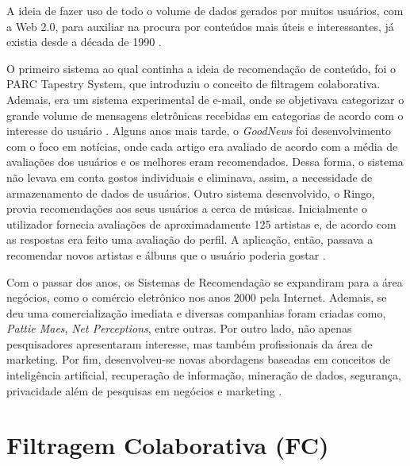A ideia de fazer uso de todo o volume de dados gerados por muitos usuários, com a Web 2.0, para auxiliar na procura por conteúdos mais úteis e interessantes, já existia desde a década de 1990 \cite{Jannach2010}.

O primeiro sistema ao qual continha a ideia de recomendação de conteúdo, foi o PARC Tapestry System, que introduziu o conceito de filtragem colaborativa. Ademais, era um sistema experimental de e-mail, onde se objetivava categorizar o grande volume de mensagens eletrônicas recebidas em categorias de acordo com o interesse do usuário \cite{Goldberg1992}.
Alguns anos mais tarde, o \textit{GoodNews} foi desenvolvimento com o foco em notícias, onde cada artigo era avaliado de acordo com a média de avaliações dos usuários e os melhores eram recomendados. Dessa forma, o sistema não levava em conta gostos individuais e eliminava, assim, a necessidade de armazenamento de dados de usuários.
Outro sistema desenvolvido, o Ringo, provia recomendações aos seus usuários a cerca de músicas. Inicialmente o utilizador fornecia avaliações  de aproximadamente 125 artistas e, de acordo com as respostas era feito uma avaliação do perfil.  A aplicação, então, passava a recomendar novos artistas e álbuns que o usuário poderia gostar \cite{Resnick1994}.

Com o passar dos anos, os Sistemas de Recomendação se expandiram para a área negócios, como o comércio eletrônico nos anos 2000 pela Internet. Ademais, se deu uma comercialização imediata e diversas companhias foram criadas como, \textit{Pattie Maes}, \textit{Net Perceptions}, entre outras. Por outro lado, não apenas pesquisadores apresentaram interesse, mas também profissionais da área de marketing. Por fim, desenvolveu-se novas abordagens baseadas em conceitos de inteligência artificial, recuperação de informação, mineração de dados, segurança, privacidade além de pesquisas em negócios e marketing \cite{Jannach2010}.



\section{Filtragem Colaborativa (FC)} \label{sec:filtragem-colaborativa}
    
